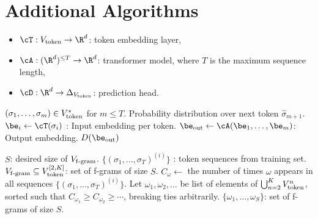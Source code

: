 

\section{Additional Algorithms}\label{sec:add_algorithms}



{\renewcommand{\baselinestretch}{1.35}\selectfont
\begin{algorithm}[t]
\caption{Basic Next-Word Prediction Model $M_{\cT, \cA, \cD}$.}
\label{alg:basic-model}
\begin{algorithmic}
\begin{itemize}[itemsep=-3pt]
    \item $\cT : \Vtoken \to \R^d$: token embedding layer,
    \item $\cA : (\R^d)^{\le T} \to \R^d$: transformer model, where $T$ is the maximum sequence length,
    \item $\cD : \R^d \to \Delta_{\Vtoken}$: prediction head.
\end{itemize}
 $(\sigma_1, \ldots, \sigma_m) \in V_{\mathrm{token}}^*$ for $m \le T$.
 Probability distribution over next token $\hat{\sigma}_{m+1}$.
    \STATE $\be_i \gets \cT(\sigma_i)$ : Input embedding per token.
\ENDFOR
\STATE $\be_{\mathrm{out}} \gets \cA(\be_1, \ldots, \be_m)$: Output embedding.
\RETURN $D(\be_{\mathrm{out}})$
\end{algorithmic}
\end{algorithm}
}


{\renewcommand{\baselinestretch}{1.35}\selectfont
\begin{algorithm}[t]
\caption{Constructing a set of f-grams $\Vfgram$.}
\label{alg:n-gram-vocab}
\begin{algorithmic}
 $S$: desired size of $\Vfgram$.
 $\{(\sigma_1, \ldots, \sigma_{T})^{(i)}\}$ : token sequences from training set.
 $V_{\mathrm{f\text{-}gram}} \subseteq V_{\mathrm{token}}^{[2,K]}$: set of f-grams of size $S$.
        \STATE $C_{\omega} \gets$ the number of times $\omega$ appears in all sequences $\{(\sigma_1, \ldots, \sigma_{T})^{(i)}\}$.
    \ENDFOR
\ENDFOR
\STATE Let $\omega_1, \omega_2, \ldots $ be list of elements of $\bigcup_{n=2}^K V_{\mathrm{token}}^{n}$, sorted such that $C_{\omega_1} \ge C_{\omega_2} \ge \cdots$, breaking ties arbitrarily.
\RETURN $\{\omega_1, \ldots, \omega_{S}\}$: set of f-grams of size $S$.
\end{algorithmic}
\end{algorithm}
}

